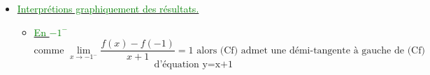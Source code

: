 \documentclass[12pt]{article}
\begin{document}
\begin{enumerate}
\begin{enumerate}
\begin{itemize}
\item \underline{\textcolor{green}{Interprétions graphiquement des résultats.}}

\begin{itemize}
\item \underline{\textcolor{green}{En $-1^{-}$}}
\[\text{comme } \lim_{x \to -1^{-}} \frac{f(x)-f(-1)}{x+1}=1 \text{ alors (Cf) admet une démi-tangente à gauche de (Cf)} \]
\[\text{d'équation y=x+1} \]
\end{itemize}

\end{itemize}
\end{enumerate}
\end{enumerate}
\end{document}
